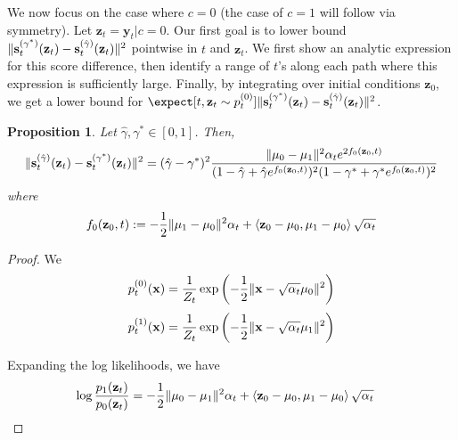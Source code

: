\documentclass[11pt]{article}
\newcommand{\fitparenth}[1]{\left(#1\right)}
\newcommand{\inprod}[1]{\left\langle#1\right\rangle}
\newcommand{\vect}[1]{\mathbf{#1}}
\theoremstyle{plain}
\newtheorem{proposition}[theorem]{Proposition}
\newcommand{\1}{\mathbbm{1}}
\DeclarePairedDelimiter{\norm}{\lVert}{\rVert}
\newcommand{\vx}{\vect{x}}
\newcommand{\pdist}[2][]{p_{#1}^{(#2)}}
\newcommand{\score}[2][]{\vect{s}_{#1}^{(#2)}}
\begin{document}
\begin{appendices}
We now focus on the case where $c=0$ (the case of $c=1$ will follow via symmetry). Let $\vect z_t = \vect y_t|c=0$. Our first goal is to lower bound $\norm{\score[t]{\gamma^*}(\vect z_t) - \score[t]{\hat \gamma}(\vect z_t)}^2$ pointwise in $t$ and $\vect z_t$. We first show an analytic expression for this score difference, then identify a range of $t$'s along each path where this expression is sufficiently large. Finally, by integrating over initial conditions $\vect z_0$, we get a lower bound for $\expect[t,\vect z_t\sim \pdist[t]{0}]{\norm{\score[t]{\gamma^*}(\vect z_t)-\score[t]{\hat\gamma}(\vect z_t)}^2}$.
\begin{proposition}\label{prop:exact norm expr}
    Let $\hat \gamma, \gamma^*\in [0,1]$. Then, 
    \[\norm{\score[t]{\hat \gamma}(\vect z_t) - \score[t]{\gamma^{*}}(\vect z_t)}^2 = ({\hat\gamma}-\gamma^*)^2  \frac{\norm{\mu_0-\mu_1}^2 \alpha_te^{2f_0(\vect z_0, t)}}{(1-{\hat\gamma} + {\hat\gamma}e^{f_0(\vect z_0, t)})^2 (1-\gamma^* + \gamma^* e^{f_0(\vect z_0, t)})^2}\]
    where 
    \[f_0(\vect z_0, t):=-\frac{1}{2}\norm{\mu_1-\mu_0}^2\alpha_t + \inprod{\vect z_0 - \mu_0, \mu_1 - \mu_0}\sqrt{\alpha_t}\]
\end{proposition}

\begin{proof}
    We \[\pdist[t]{0}(\vx)=\frac{1}{Z_t}\exp\fitparenth{-\frac{1}{2}\norm{\vx-\sqrt{\alpha_t}\mu_0}^2}\]
     \[\pdist[t]{1}(\vx)=\frac{1}{Z_t}\exp\fitparenth{-\frac{1}{2}\norm{\vx-\sqrt{\alpha_t}\mu_1}^2}\]

    Expanding the log likelihoods, we have
    \begin{align*}
        \log \frac{p_1(\vect z_t)}{p_0(\vect z_t)}&= -\frac{1}{2} \norm{\mu_0-\mu_1}^2 \alpha_t + \inprod{\vect z_0 - \mu_0, \mu_1 - \mu_0}\sqrt{\alpha_t}
    \end{align*}


\end{proof}
\end{appendices}
\end{document}
